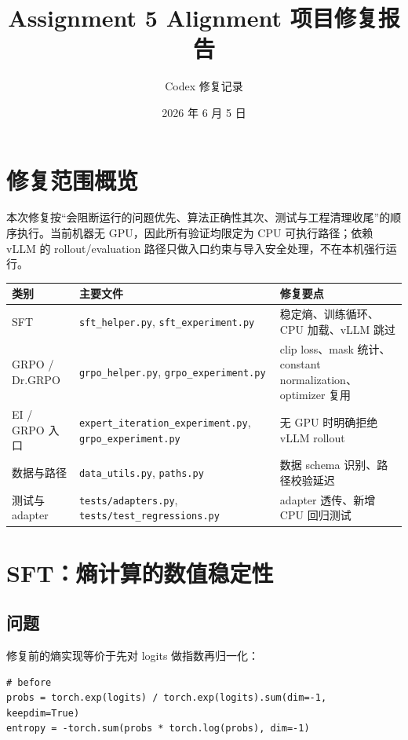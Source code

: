 \documentclass[UTF8,a4paper,11pt]{ctexart}
\title{Assignment 5 Alignment 项目修复报告}
\author{Codex 修复记录}
\date{2026 年 6 月 5 日}
\begin{document}
\maketitle

\section{修复范围概览}

本次修复按“会阻断运行的问题优先、算法正确性其次、测试与工程清理收尾”的顺序执行。当前机器无 GPU，因此所有验证均限定为 CPU 可执行路径；依赖 vLLM 的 rollout/evaluation 路径只做入口约束与导入安全处理，不在本机强行运行。

\begin{table}[h]
\centering
\begin{tabularx}{\textwidth}{lX X}
\toprule
类别 & 主要文件 & 修复要点 \\
\midrule
SFT & \texttt{sft\_helper.py}, \texttt{sft\_experiment.py} & 稳定熵、训练循环、CPU 加载、vLLM 跳过 \\
GRPO / Dr.GRPO & \texttt{grpo\_helper.py}, \texttt{grpo\_experiment.py} & clip loss、mask 统计、constant normalization、optimizer 复用 \\
EI / GRPO 入口 & \texttt{expert\_iteration\_experiment.py}, \texttt{grpo\_experiment.py} & 无 GPU 时明确拒绝 vLLM rollout \\
数据与路径 & \texttt{data\_utils.py}, \texttt{paths.py} & 数据 schema 识别、路径校验延迟 \\
测试与 adapter & \texttt{tests/adapters.py}, \texttt{tests/test\_regressions.py} & adapter 透传、新增 CPU 回归测试 \\
\bottomrule
\end{tabularx}
\end{table}

\section{SFT：熵计算的数值稳定性}

\subsection{问题}

修复前的熵实现等价于先对 logits 做指数再归一化：

\begin{lstlisting}
# before
probs = torch.exp(logits) / torch.exp(logits).sum(dim=-1, keepdim=True)
entropy = -torch.sum(probs * torch.log(probs), dim=-1)
\end{lstlisting}
\end{document}
